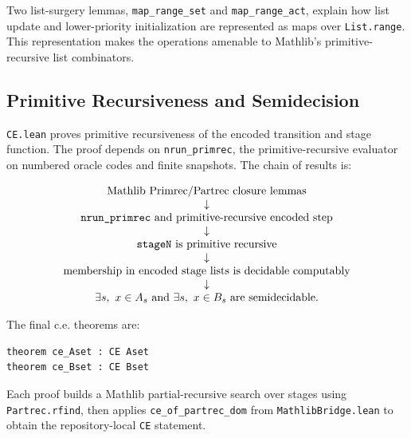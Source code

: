 Two list-surgery lemmas, \texttt{map_range_set} and \texttt{map_range_act},
explain how list update and lower-priority initialization are represented
as maps over \texttt{List.range}.  This representation makes the operations
amenable to Mathlib's primitive-recursive list combinators.

\subsection{Primitive Recursiveness and Semidecision}

\texttt{CE.lean} proves primitive recursiveness of the encoded transition
and stage function.  The proof depends on \texttt{nrun_primrec}, the
primitive-recursive evaluator on numbered oracle codes and finite
snapshots.  The chain of results is:

\[
\begin{array}{c}
\text{Mathlib Primrec/Partrec closure lemmas}\\
\downarrow\\
\text{\texttt{nrun\_primrec} and primitive-recursive encoded step}\\
\downarrow\\
\text{\texttt{stageN} is primitive recursive}\\
\downarrow\\
\text{membership in encoded stage lists is decidable computably}\\
\downarrow\\
\exists s,\ x\in A_s \text{ and } \exists s,\ x\in B_s
\text{ are semidecidable.}
\end{array}
\]

The final c.e. theorems are:

\begin{lstlisting}
theorem ce_Aset : CE Aset
theorem ce_Bset : CE Bset
\end{lstlisting}

Each proof builds a Mathlib partial-recursive search over stages using
\texttt{Partrec.rfind}, then applies \texttt{ce_of_partrec_dom} from
\texttt{MathlibBridge.lean} to obtain the repository-local \texttt{CE}
statement.

